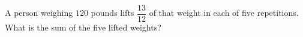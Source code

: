 A person weighing $120$ pounds lifts $\dfrac{13}{12}$ of that weight in each of five repetitions. What is the sum of the five lifted weights?
